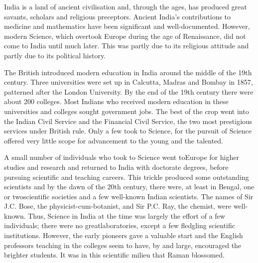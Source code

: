 \noindent
India is a land of ancient civilisation and, through the ages, has produced great savants, scholars and religious preceptors. Ancient \hbox{India's} contributions to medicine and mathematics have been signi\-fi\-cant and well-documented. However, modern Science, which overtook Europe during the age of Renaissance, did not come to India until much later. This was partly due to its religious attitude and partly due to its political history.

The British introduced modern education in India around the middle of the 19th century. Three universities were set up in \hbox{Calcutta}, Madras and Bombay in 1857, patterned after the London University. By the end of the 19th century there were about 200 colleges. Most Indians who received modern education in these universities and colleges sought government jobs. The best of the crop went into the Indian Civil Service and the Financial Civil Service, the two most prestigious services under British rule. Only a few took to Science, for the pursuit of Science offered very little scope for advancement to the young and the talented.

A small number of individuals who took to Science went to\break \hbox{Europe} for higher studies and research and returned to India with doctorate degrees, before pursuing scientific and teaching careers. This trickle produced some outstanding scientists and by the dawn of the 20th century, there were, at least in Bengal, one or two\break scientific societies and a few well-known Indian scientists. The names of Sir J.C. Bose, the physicist-cum-botanist, and Sir P.C\@. Ray, the chemist, were well-known. Thus, Science in India at the time was largely the effort of a few individuals; there were no great\break laboratories, except a few fledgling scientific institutions. However, the early pioneers gave a valuable start and the English professors teaching in the colleges seem to have, by and large, encouraged the brighter students. It was in this scientific milieu that Raman blossomed.

\medskip
{}
\smallskip




